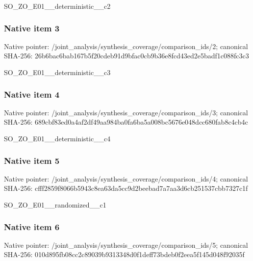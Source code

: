 \documentclass[10pt,a4paper]{article}
\begin{document}
\begingroup\raggedright\sloppy SO\_\allowbreak{}ZO\_\allowbreak{}E01\_\allowbreak{}\_\allowbreak{}deterministic\_\allowbreak{}\_\allowbreak{}c2\par\endgroup

\subsubsection{Native item 3}
Native pointer: /joint\_\allowbreak{}analysis/synthesis\_\allowbreak{}coverage/comparison\_\allowbreak{}ids/2; canonical SHA-256: 26b6bac6bab167b5f20cdeb91d9bfac0cb9b36e8fcd43ed2e5badf1c088fc3c3

\begingroup\raggedright\sloppy SO\_\allowbreak{}ZO\_\allowbreak{}E01\_\allowbreak{}\_\allowbreak{}deterministic\_\allowbreak{}\_\allowbreak{}c3\par\endgroup

\subsubsection{Native item 4}
Native pointer: /joint\_\allowbreak{}analysis/synthesis\_\allowbreak{}coverage/comparison\_\allowbreak{}ids/3; canonical SHA-256: 689cbf83ed0a4af2df49aa984ba0fa6ba5a008bc5676e048dcc680fab8c4cb4c

\begingroup\raggedright\sloppy SO\_\allowbreak{}ZO\_\allowbreak{}E01\_\allowbreak{}\_\allowbreak{}deterministic\_\allowbreak{}\_\allowbreak{}c4\par\endgroup

\subsubsection{Native item 5}
Native pointer: /joint\_\allowbreak{}analysis/synthesis\_\allowbreak{}coverage/comparison\_\allowbreak{}ids/4; canonical SHA-256: cfff2859f8066b5943c8ea63da5cc9d2beebad7a7aa3d6cb251537cbb7327c1f

\begingroup\raggedright\sloppy SO\_\allowbreak{}ZO\_\allowbreak{}E01\_\allowbreak{}\_\allowbreak{}randomized\_\allowbreak{}\_\allowbreak{}c1\par\endgroup

\subsubsection{Native item 6}
Native pointer: /joint\_\allowbreak{}analysis/synthesis\_\allowbreak{}coverage/comparison\_\allowbreak{}ids/5; canonical SHA-256: 010d895fb08cc2c89039b9313348d0f1deff73bdeb0f2eea5f145d048f92035f
\end{document}
